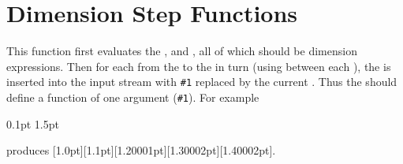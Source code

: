 \documentclass[oneside]{book}
\begin{document}
\section{Dimension Step Functions}


\begin{function}{\DimStepInline}
\begin{syntax}
    
\end{syntax}
This function first evaluates the , 
and , all of which should be dimension expressions.
Then for each  from the  to the
 in turn (using  between each
), the  is inserted into the input stream
with \verb|#1| replaced by the current .  Thus the
 should define a function of one argument (\verb|#1|).
For example
\begin{codehigh}
\IgnoreSpacesOn
\TlClear \lTmpaTl
\DimStepInline {1pt} {0.1pt} {1.5pt} {
  \TlPutRight \lTmpaTl {[#1]}
}
\Result {\Value\lTmpaTl}
\IgnoreSpacesOff
\end{codehigh}
produces [1.0pt][1.1pt][1.20001pt][1.30002pt][1.40002pt].
\end{function}
\end{document}
